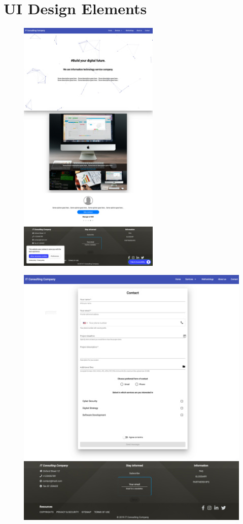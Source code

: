 \documentclass{article} %
\begin{document}
\section{UI Design Elements}
\label{sec:appendices}
\begin{figure}[ht]
  \centering
      \includegraphics[width=0.6\textwidth]{thesisapp1.png}
\end{figure}
\begin{figure}[ht]
  \centering
      \includegraphics[width=1\textwidth]{thesisapp2.png}
\end{figure}
\end{document}
